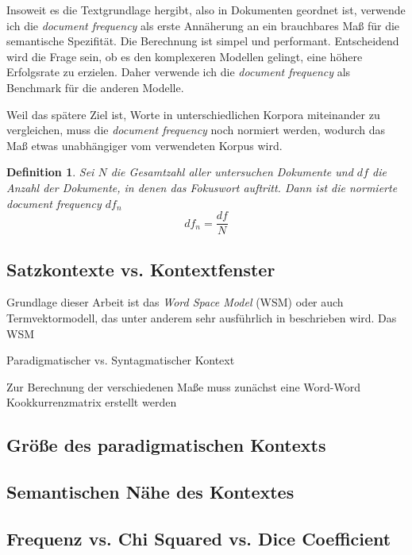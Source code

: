 \documentclass[11pt,numbers=noenddot]{scrartcl}
\newtheorem*{document frequency}{Definition}
\begin{document}
Insoweit es die Textgrundlage hergibt, also in Dokumenten geordnet ist, verwende ich die \emph{document frequency} als erste Annäherung an ein brauchbares Maß für die semantische Spezifität. Die Berechnung ist simpel und performant. Entscheidend wird die Frage sein, ob es den komplexeren Modellen gelingt, eine höhere Erfolgsrate zu erzielen. Daher verwende ich die \emph{document frequency} als Benchmark für die anderen Modelle.

Weil das spätere Ziel ist, Worte in unterschiedlichen Korpora miteinander zu vergleichen, muss die \emph{document frequency} noch normiert werden, wodurch das Maß etwas unabhängiger vom verwendeten Korpus wird.

\begin{document frequency}
Sei $N$ die Gesamtzahl aller untersuchen Dokumente und $df$ die Anzahl der Dokumente, in denen das Fokuswort auftritt. Dann ist die normierte document frequency $df_n$
\begin{equation}
    df_n = \frac{df}{N}
\end{equation}
\end{document frequency}

\subsection{Satzkontexte vs. Kontextfenster}

Grundlage dieser Arbeit ist das \emph{Word Space Model} (WSM) oder auch Termvektormodell, das unter anderem sehr ausführlich in \citet{sahlgren2006word} beschrieben wird. Das WSM 

Paradigmatischer vs. Syntagmatischer Kontext

Zur Berechnung der verschiedenen Maße muss zunächst eine Word-Word Kookkurrenzmatrix erstellt werden

\subsection{Größe des paradigmatischen Kontexts}

\subsection{Semantischen Nähe des Kontextes}

\subsection{Frequenz vs. Chi Squared vs. Dice Coefficient}
\end{document}
